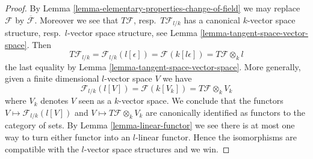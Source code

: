 \documentclass[10pt,a4paper]{amsart}
\theoremstyle{plain}
\theoremstyle{definition}
\theoremstyle{remark}
\numberwithin{equation}{subsection}
\begin{document}
\begin{proof}
By Lemma \ref{lemma-elementary-properties-change-of-field} we may replace
$\mathcal{F}$ by $\overline{\mathcal{F}}$. Moreover we see that
$T\mathcal{F}$, resp.\ $T\mathcal{F}_{l/k}$ has a canonical
$k$-vector space structure, resp.\ $l$-vector space structure, see
Lemma \ref{lemma-tangent-space-vector-space}. Then
$$
T\mathcal{F}_{l/k} = \mathcal{F}_{l/k}(l[\epsilon])
= \mathcal{F}(k[l\epsilon]) = T\mathcal{F} \otimes_k l
$$
the last equality by Lemma \ref{lemma-tangent-space-vector-space}.
More generally, given a finite dimensional $l$-vector space $V$ we have
$$
\mathcal{F}_{l/k}(l[V]) = \mathcal{F}(k[V_k]) = T\mathcal{F} \otimes_k V_k
$$
where $V_k$ denotes $V$ seen as a $k$-vector space. We conclude that
the functors $V \mapsto \mathcal{F}_{l/k}(l[V])$ and
$V \mapsto T\mathcal{F} \otimes_k V_k$ are canonically identified
as functors to the category of sets. By Lemma \ref{lemma-linear-functor}
we see there is at most one way to turn either functor into an $l$-linear
functor. Hence the isomorphisms are compatible with the $l$-vector space
structures and we win.
\end{proof}
\end{document}

